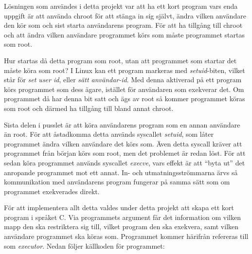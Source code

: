 \documentclass{article}
\begin{document}
Lösningen som användes i detta projekt var att ha ett kort program vars enda
uppgift är att använda chroot för att stänga in sig självt, ändra vilken
användare den kör som och sist starta användarens program. För att ha tillgång
till chroot och att ändra vilken användare programmet körs som måste programmet
startas som root.

Hur startas då detta program som root, utan att programmet som startar det måste
köra som root? I Linux kan ett program markeras med \textit{setuid}-biten,
vilket står för \textit{set user id}, eller \textit{sätt användar-id}. Med
denna aktiverad på ett program körs programmet som dess ägare, istället för
användaren som exekverar det. Om programmet då har denna bit satt och ägs av
root så kommer programmet köras som root och därmed ha tillgång till bland annat
chroot.

Sista delen i pusslet är att köra användarens program som en annan användare än
root. För att åstadkomma detta används syscallet \textit{setuid}, som låter
programmet ändra vilken användare det körs som. Även detta syscall kräver att
programmet från början körs som root, men det problemet är redan löst. För att
sedan köra programmet används syscallet \textit{execve}, vars effekt är att
``byta ut'' det anropande programmet mot ett annat. In- och utmatningsströmmarna
ärvs så kommunikation med användarens program fungerar på samma sätt som om
programmet exekverades direkt.

\hypertarget{executor}{}
\label{executor}

För att implementera allt detta valdes under detta projekt att skapa ett kort
program i språket C. Via programmets argument får det information om vilken mapp
den ska restriktera sig till, vilket program den ska exekvera, samt vilken
användare programmet ska köras som. Programmet kommer härifrån refereras till
som \textit{executor}. Nedan följer källkoden för programmet:
\end{document}

